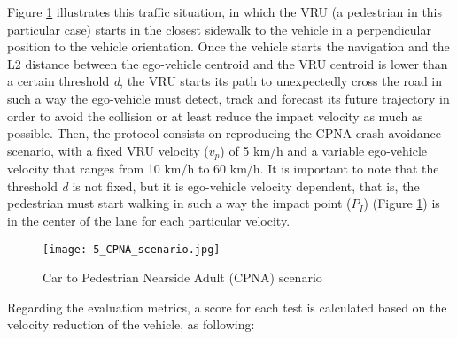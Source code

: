 Figure \ref{fig:5_cpna_scenario} illustrates this traffic situation, in which the VRU (a pedestrian in this particular case) starts in the closest sidewalk to the vehicle in a perpendicular position to the vehicle orientation. Once the vehicle starts the navigation and the L2 distance between the ego-vehicle centroid and the VRU centroid is lower than a certain threshold \textit{d}, the VRU starts its path to unexpectedly cross the road in such a way the ego-vehicle must detect, track and forecast its future trajectory in order to avoid the collision or at least reduce the impact velocity as much as possible. Then, the protocol consists on reproducing the CPNA crash avoidance scenario, with a fixed VRU velocity (\(v_p\)) of 5 km/h and a variable ego-vehicle velocity that ranges from 10 km/h to 60 km/h. It is important to note that the threshold \textit{d} is not fixed, but it is ego-vehicle velocity dependent, that is, the pedestrian must start walking in such a way the impact point (\(P_I\)) (Figure \ref{fig:5_cpna_scenario}) is in the center of the lane for each particular velocity. 

\begin{figure}[h]
	\centering\texttt{[image: 5\_CPNA\_scenario.jpg]}
	\caption{Car to Pedestrian Nearside Adult (CPNA) scenario}	
	\label{fig:5_cpna_scenario}
\end{figure}

Regarding the evaluation metrics, a score for each test is calculated based on the velocity reduction of the vehicle, as following:

